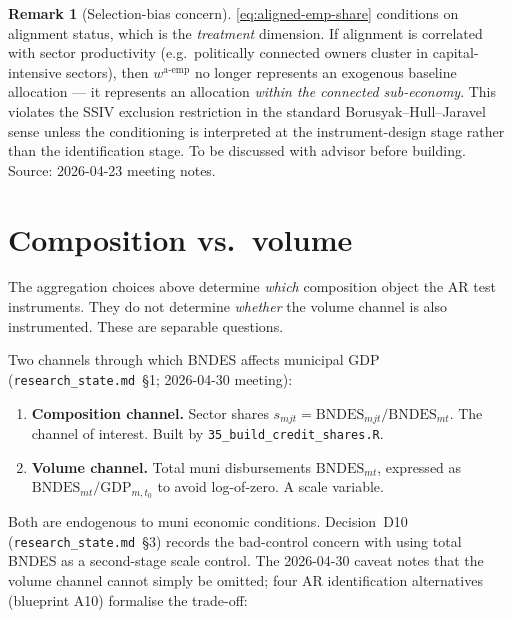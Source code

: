 \documentclass[12pt]{article}
\theoremstyle{definition}
\newtheorem{remark}{Remark}
\begin{document}
\begin{remark}[Selection-bias concern]
\cref{eq:aligned-emp-share} conditions on alignment status, which is the \emph{treatment} dimension. If alignment is correlated with sector productivity (e.g.\ politically connected owners cluster in capital-intensive sectors), then $w^{\text{a-emp}}$ no longer represents an exogenous baseline allocation --- it represents an allocation \emph{within the connected sub-economy}. This violates the SSIV exclusion restriction in the standard Borusyak--Hull--Jaravel sense unless the conditioning is interpreted at the instrument-design stage rather than the identification stage. To be discussed with advisor before building. Source: 2026-04-23 meeting notes.
\end{remark}

\section{Composition vs.\ volume}
\label{sec:composition-vs-volume}

The aggregation choices above determine \emph{which} composition object the AR test instruments. They do not determine \emph{whether} the volume channel is also instrumented. These are separable questions.

Two channels through which BNDES affects municipal GDP (\texttt{research\_state.md}~\S1; 2026-04-30 meeting):
\begin{enumerate}[leftmargin=2em, itemsep=2pt, label=(\arabic*)]
\item \textbf{Composition channel.} Sector shares $s_{m j t} = \mathrm{BNDES}_{m j t}/\mathrm{BNDES}_{m t}$. The channel of interest. Built by \texttt{35\_build\_credit\_shares.R}.
\item \textbf{Volume channel.} Total muni disbursements $\mathrm{BNDES}_{m t}$, expressed as $\mathrm{BNDES}_{m t}/\mathrm{GDP}_{m,t_0}$ to avoid log-of-zero. A scale variable.
\end{enumerate}

Both are endogenous to muni economic conditions. Decision~D10 (\texttt{research\_state.md}~\S3) records the bad-control concern with using total BNDES as a second-stage scale control. The 2026-04-30 caveat notes that the volume channel cannot simply be omitted; four AR identification alternatives (blueprint A10) formalise the trade-off:
\end{document}
